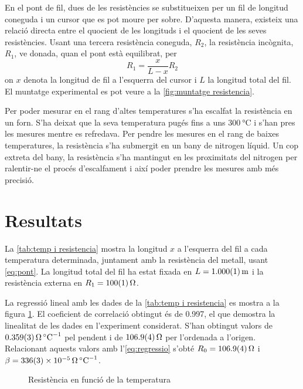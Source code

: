 En el pont de fil, dues de les resistències se substitueixen per un fil de longitud coneguda i un cursor que es pot moure per sobre. D'aquesta manera, existeix una relació directa entre el quocient de les longituds i el quocient de les seves resistències. Usant una tercera resistència coneguda, $R_2$, la resistència incògnita, $R_1$, ve donada, quan el pont està equilibrat, per
\begin{equation}\label{eq:pont}
R_1=\frac{x}{L-x}R_2
\end{equation}
on $x$ denota la longitud de fil a l'esquerra del cursor i $L$ la longitud total del fil. El muntatge experimental es pot veure a la \cref{fig:muntatge resistencia}. 

Per poder mesurar en el rang d'altes temperatures s'ha escalfat la resistència en un forn. S'ha deixat que la seva temperatura pugés fins a uns $\SI{300}{\celsius}$ i s'han pres les mesures mentre es refredava. Per pendre les mesures en el rang de baixes temperatures, la resistència s'ha submergit en un bany de nitrogen líquid. Un cop extreta del bany, la resistència s'ha mantingut en les proximitats del nitrogen per ralentir-ne el procés d'escalfament i així poder prendre les mesures amb més precisió. 

\section{Resultats}
La \cref{tab:temp i resistencia} mostra la longitud $x$ a l'esquerra del fil a cada temperatura determinada, juntament amb la resistència del metall, usant \cref{eq:pont}. La longitud total del fil ha estat fixada en $L=\data{1.000}{0.001}{\meter}$ i la resistència externa en $R_1=\data{100}{1}{\ohm}$.

La regressió lineal amb les dades de la \cref{tab:temp i resistencia} es mostra a la figura \ref{fig:temp v resistencia}. El coeficient de correlació obtingut és de 0.997, el que demostra la linealitat de les dades en l'experiment considerat. S'han obtingut valors de $\data{0.359}{0.003}{\ohm\per\celsius}$ pel pendent i de $\data{106.9}{0.4}{\ohm}$ per l'ordenada a l'origen. Relacionant aquests valors amb l'\cref{eq:regressio} s'obté $R_0=\data{106.9}{0.4}{\ohm}$ i $\beta=\data{336}{3e-5}{\ohm\per\celsius}$.

\begin{figure} [htb]
	\centering
	\small \sffamily
	
	\caption{Resistència en funció de la temperatura}
	\label{fig:temp v resistencia}
\end{figure}

